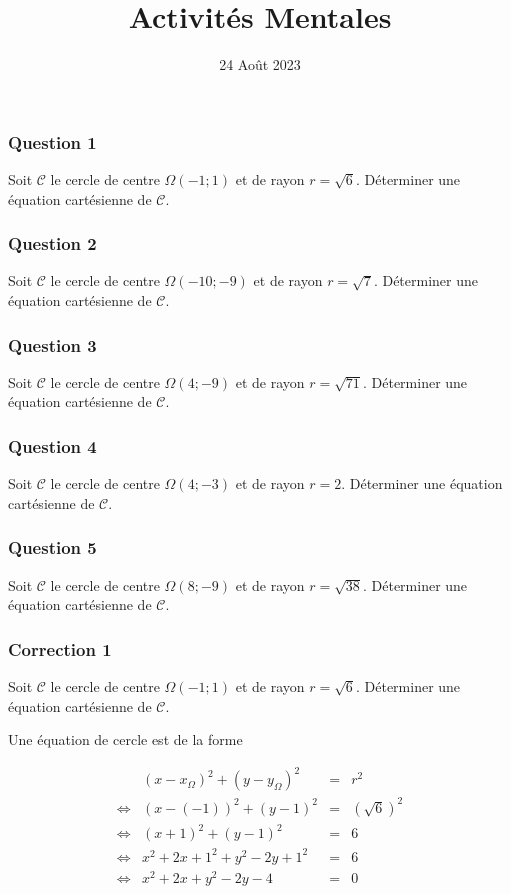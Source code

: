 \documentclass[15pt, mathserif]{beamer}
\title{Activités Mentales}
\date{24 Août 2023}
\begin{document}
\begin{frame}
    \titlepage
\end{frame}

\begin{frame} 
	\frametitle{Question 1}
Soit $\mathcal{C}$ le cercle de centre $\Omega(-1;1)$ et de rayon $r=\sqrt{6}$. Déterminer une équation cartésienne de $\mathcal{C}$. \end{frame}


\begin{frame} 
	\frametitle{Question 2}
Soit $\mathcal{C}$ le cercle de centre $\Omega(-10;-9)$ et de rayon $r=\sqrt{7}$. Déterminer une équation cartésienne de $\mathcal{C}$. \end{frame}


\begin{frame} 
	\frametitle{Question 3}
Soit $\mathcal{C}$ le cercle de centre $\Omega(4;-9)$ et de rayon $r=\sqrt{71}$. Déterminer une équation cartésienne de $\mathcal{C}$. \end{frame}


\begin{frame} 
	\frametitle{Question 4}
Soit $\mathcal{C}$ le cercle de centre $\Omega(4;-3)$ et de rayon $r=2$. Déterminer une équation cartésienne de $\mathcal{C}$. \end{frame}


\begin{frame} 
	\frametitle{Question 5}
Soit $\mathcal{C}$ le cercle de centre $\Omega(8;-9)$ et de rayon $r=\sqrt{38}$. Déterminer une équation cartésienne de $\mathcal{C}$. \end{frame}


\begin{frame}
\vspace{-10mm}
	\frametitle{Correction 1}
Soit $\mathcal{C}$ le cercle de centre $\Omega(-1;1)$ et de rayon $r=\sqrt{6}$. Déterminer une équation cartésienne de $\mathcal{C}$. 
 
 \bigskip 
 Une équation de cercle est de la forme 
 
 $$\begin{array}{crcl} 
 & (x-x_{\Omega})^2+(y-y_{\Omega})^2 & = &r^2 \\ 
 \Leftrightarrow & (x- \left(-1\right))^2+(y-1)^2 & = & \left(\sqrt{6} \right)^2 \\ 
 \Leftrightarrow & (x+1)^2+(y-1)^2 & = &  6\\ 
 \Leftrightarrow & x^2+2x+1^2+y^2-2y+1^2& = &  6\\ 
 \Leftrightarrow & x^2+2x+y^2-2y-4 & = & 0 
 \end{array}$$ 
 
 \end{frame}
\end{document}
